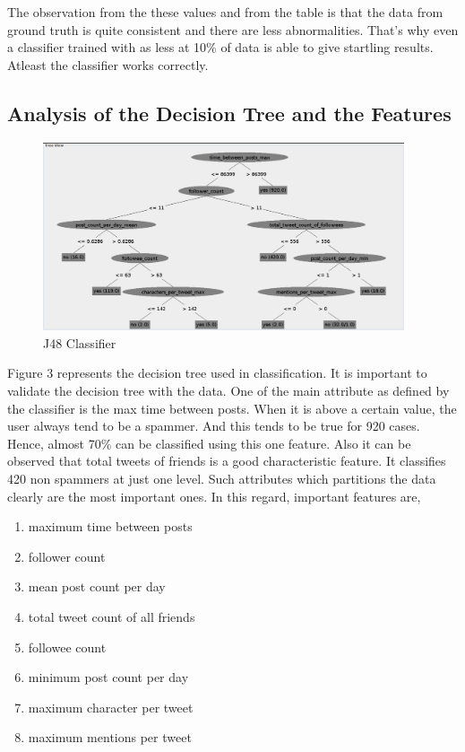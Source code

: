 \documentclass[11pt]{article}
\begin{document}
\begin{enumerate}
The observation from the these values and from the table is that the data from ground truth is quite consistent and there are less abnormalities. That's why even a classifier trained with as less at 10\% of data is able to give startling results. Atleast the classifier works correctly. 
\end{enumerate}

\subsection{Analysis of the Decision Tree and the Features}
\begin{figure}
\centering
\includegraphics[width=0.95\textwidth,natwidth=610,natheight=642]{classifier.pdf}
\caption{J48 Classifier}
\end{figure}

Figure 3 represents the decision tree used in classification. It is important to validate the decision tree with the data. One of the main attribute as defined by the classifier is the max time between posts. When it is above a certain value, the user always tend to be a spammer. And this tends to be true for 920 cases. Hence, almost 70\% can be classified using this one feature. Also it can be observed that total tweets of friends is a good characteristic feature. It classifies 420 non spammers at just one level. Such attributes which partitions the data clearly are the most important ones. In this regard, important features are,
\newline
\begin{enumerate}
\item maximum time between posts %
\item follower count %
\item mean post count per day %
\item total tweet count of all friends %
\item followee count %
\item minimum post count per day %
\item maximum character per tweet %
\item maximum mentions per tweet %
\end{enumerate}
\end{document}
